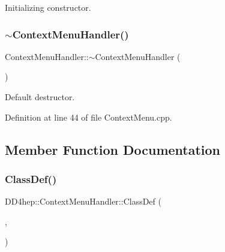 Initializing constructor. 

\hypertarget{class_d_d4hep_1_1_context_menu_handler_aa44899588abd2731d4e38a6a80bd8443}{}\label{class_d_d4hep_1_1_context_menu_handler_aa44899588abd2731d4e38a6a80bd8443} 
\subsubsection{\texorpdfstring{$\sim$\+Context\+Menu\+Handler()}{~ContextMenuHandler()}}
{\footnotesize\ttfamily Context\+Menu\+Handler\+::$\sim$\+Context\+Menu\+Handler (\begin{DoxyParamCaption}{ }\end{DoxyParamCaption})\hspace{0.3cm}{\ttfamily [virtual]}}



Default destructor. 



Definition at line 44 of file Context\+Menu.\+cpp.



\subsection{Member Function Documentation}
\hypertarget{class_d_d4hep_1_1_context_menu_handler_a1464908be325d3eef9a71cffa57d0968}{}\label{class_d_d4hep_1_1_context_menu_handler_a1464908be325d3eef9a71cffa57d0968} 
\subsubsection{\texorpdfstring{Class\+Def()}{ClassDef()}}
{\footnotesize\ttfamily D\+D4hep\+::\+Context\+Menu\+Handler\+::\+Class\+Def (\begin{DoxyParamCaption}\item[{\hyperlink{class_d_d4hep_1_1_context_menu_handler}{Context\+Menu\+Handler}}]{,  }\item[{0}]{ }\end{DoxyParamCaption})}



